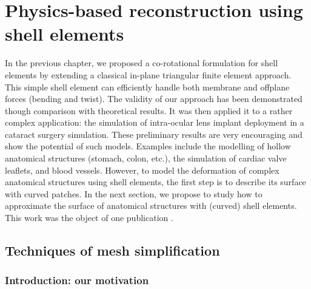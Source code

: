 \chapter{Physics-based reconstruction using shell elements}
\label{chap10}
\begin{shortAbstract}
In the previous chapter, we proposed a co-rotational formulation for shell elements by extending a classical in-plane triangular finite element approach. This simple shell element can efficiently handle both membrane and offplane forces (bending and twist). The validity of our approach has been demonstrated though comparison with theoretical results. It was then applied it to a rather complex application: the simulation of intra-ocular lens implant deployment in a cataract surgery simulation. These preliminary results are very encouraging and show the potential of such models. Examples include the modelling of hollow anatomical structures (stomach, colon, etc.), the simulation of cardiac valve leaflets, and blood vessels. However, to model the deformation of complex anatomical structures using shell elements, the first step is to describe its surface with curved patches. In the next section, we propose to study how to approximate the surface of anatomical structures with (curved) shell elements. This work was the object of one publication \citep{Comas2010b}.
\end{shortAbstract}


\section{Techniques of mesh simplification}

\subsection{Introduction: our motivation}

